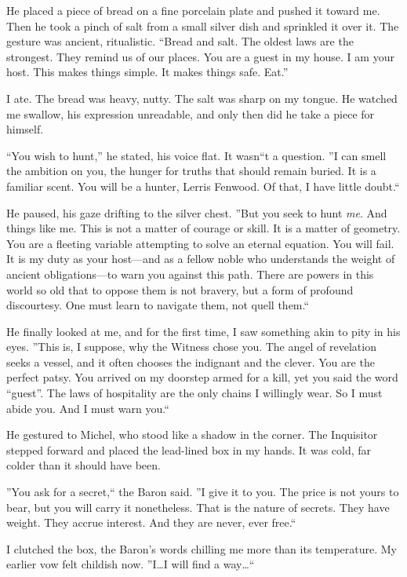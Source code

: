 \documentclass[11pt]{article}
\begin{document}
He placed a piece of bread on a fine porcelain plate and pushed it toward me. Then he took a pinch of salt from a small silver dish and sprinkled it over it. The gesture was ancient, ritualistic. ``Bread and salt. The oldest laws are the strongest. They remind us of our places. You are a guest in my house. I am your host. This makes things simple. It makes things safe. Eat.''

I ate. The bread was heavy, nutty. The salt was sharp on my tongue. He watched me swallow, his expression unreadable, and only then did he take a piece for himself.

``You wish to hunt,'' he stated, his voice flat. It wasn``t a question. ''I can smell the ambition on you, the hunger for truths that should remain buried. It is a familiar scent. You will be a hunter, Lerris Fenwood. Of that, I have little doubt.``

He paused, his gaze drifting to the silver chest. ''But you seek to hunt \textit{me}. And things like me. This is not a matter of courage or skill. It is a matter of geometry. You are a fleeting variable attempting to solve an eternal equation. You will fail. It is my duty as your host---and as a fellow noble who understands the weight of ancient obligations---to warn you against this path. There are powers in this world so old that to oppose them is not bravery, but a form of profound discourtesy. One must learn to navigate them, not quell them.``

He finally looked at me, and for the first time, I saw something akin to pity in his eyes. ''This is, I suppose, why the Witness chose you. The angel of revelation seeks a vessel, and it often chooses the indignant and the clever. You are the perfect patsy. You arrived on my doorstep armed for a kill, yet you said the word ``guest''. The laws of hospitality are the only chains I willingly wear. So I must abide you. And I must warn you.``

He gestured to Michel, who stood like a shadow in the corner. The Inquisitor stepped forward and placed the lead-lined box in my hands. It was cold, far colder than it should have been.

''You ask for a secret,`` the Baron said. ''I give it to you. The price is not yours to bear, but you will carry it nonetheless. That is the nature of secrets. They have weight. They accrue interest. And they are never, ever free.``

I clutched the box, the Baron's words chilling me more than its temperature. My earlier vow felt childish now. ''I\dots I will find a way\dots``
\end{document}

